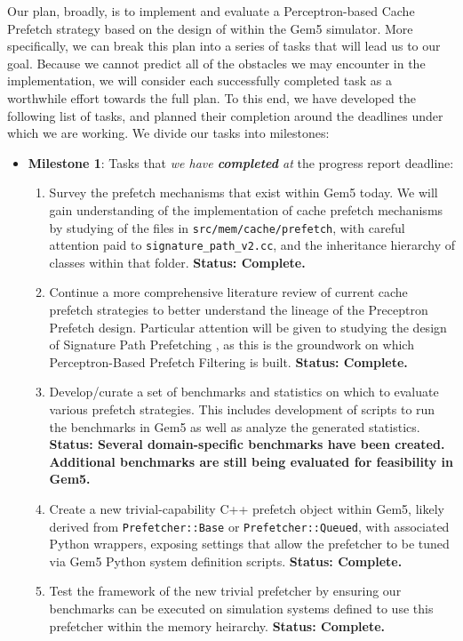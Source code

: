 \documentclass[conference]{IEEEtran}
\begin{document}
Our plan, broadly, is to implement and evaluate a Perceptron-based Cache Prefetch strategy based on the design of \cite{ppf} within the Gem5 simulator. More specifically, we can break this plan into a series of tasks that will lead us to our goal. Because we cannot predict all of the obstacles we may encounter in the implementation, we will consider each successfully completed task as a worthwhile effort towards the full plan. To this end, we have developed the following list of tasks, and planned their completion around the deadlines under which we are working. We divide our tasks into milestones: \begin{itemize}

    \item\textbf{Milestone 1}: Tasks that \emph{we have \textbf{completed} at} the progress report deadline:
  \begin{enumerate}
    \item Survey the prefetch mechanisms that exist within Gem5 today. We will gain understanding of the implementation of cache prefetch mechanisms by studying of the files in \texttt{src/mem/cache/prefetch}, with careful attention paid to \texttt{signature\_path\_v2.cc}, and the inheritance hierarchy of classes within that folder. \textbf{Status: Complete.}
    \item Continue a more comprehensive literature review of current cache prefetch strategies to better understand the lineage of the Preceptron Prefetch design. Particular attention will be given to studying the design of Signature Path Prefetching \cite{SPP}, as this is the groundwork on which Perceptron-Based Prefetch Filtering is built. \textbf{Status: Complete.}
    \item Develop/curate a set of benchmarks and statistics on which to evaluate various prefetch strategies. This includes development of scripts to run the benchmarks in Gem5 as well as analyze the generated statistics. \textbf{Status: Several domain-specific benchmarks have been created. Additional benchmarks are still being evaluated for feasibility in Gem5.}
    \item Create a new trivial-capability C++ prefetch object within Gem5, likely derived from \texttt{Prefetcher::Base} or \texttt{Prefetcher::Queued}, with associated Python wrappers, exposing settings that allow the prefetcher to be tuned via Gem5 Python system definition scripts. \textbf{Status: Complete.}
    \item Test the framework of the new trivial prefetcher by ensuring our benchmarks can be executed on simulation systems defined to use this prefetcher within the memory heirarchy. \textbf{Status: Complete.}

\end{enumerate}
\end{itemize}
\end{document}
